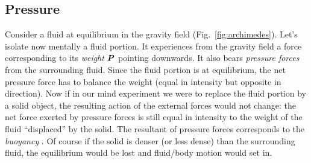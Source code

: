 \subsection{Pressure}
 Consider a fluid at equilibrium in the gravity field (Fig.~\ref{fig:archimedes}). Let's isolate now mentally a fluid portion. It experiences from the gravity field a force corresponding to its \textit{weight}  $\bP$ pointing downwards. It also bears \textit{pressure forces} from the surrounding fluid. Since the fluid portion is at equilibrium, the net pressure force has to balance the weight (equal in intensity but opposite in direction). Now if in our mind experiment we were to replace the fluid portion by a solid object, the resulting action of the external forces would not change: the net force exerted by pressure forces is still equal in intensity to the weight of the fluid ``displaced'' by the solid. The resultant of pressure forces corresponds to the \textit{buoyancy} \citep{Lighthill1986}. Of course if the solid is denser (or less dense) than the surrounding fluid, the equilibrium would be lost and fluid/body motion would set in.

